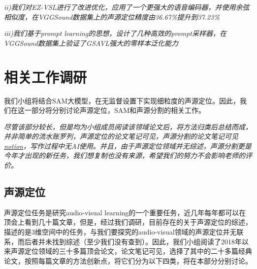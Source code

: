 \documentclass[12pt]{article}
\begin{document}
\textit{ii)我们对EZ-VSL进行了改进优化，应用了一个更强大的语音编码器，并使用余弦相似度，在VGGSound数据集上的声源定位精度由36.67\%提升到37.23\%}

\textit{iii)我们基于prompt learning的思想，设计了几种高效的prompt采样器，在VGGSound数据集上验证了GSAVL强大的零样本泛化能力}
\section{相关工作调研}
我们小组将结合SAM大模型，在无监督设置下实现细粒度的声源定位。因此，我们在这一部分将分别讨论声源定位，SAM和声源分割的相关工作。

\textit{尽管该部分较长，但是均为小组成员阅读该领域论文后，将方法归类后总结而成，并非简单的流水账罗列，声源定位的论文笔记可见\href{https://github.com/ucasmjc/ruc-visiting/blob/main/SSL.md}{\faGithub}，声源分割的论文笔记可见\href{https://numerous-jasmine-cee.notion.site/AVS-32583e7929274e4ba8d9e2c4c5a9cf17}{notion}，写作过程中无AI使用。并且，由于声源定位领域并无综述，声源分割更是今年才出现的新任务，我们想复制也没有来源，希望我们的努力不会影响老师的评价。}
\subsection{声源定位}
声源定位任务是研究audio-visual learning的一个重要任务，近几年每年都可以在顶会上看到几十篇文章，但是，经过我们调研，目前存在的关于声源定位的综述，描述的是3维空间中的任务，与我们要探究的audio-visual领域的声源定位并无联系，而后者并未找到综述（至少我们没有查到）。因此，我们小组阅读了2018年以来声源定位领域的三十多篇顶会论文，论文笔记可见\href{https://github.com/ucasmjc/ruc-visiting/blob/main/SSL.md}{\faGithub}，选择了其中的二十多篇经典论文，按照每篇文章的方法创新点，将它们分为以下四类，将在本部分分别讨论。
\end{document}
